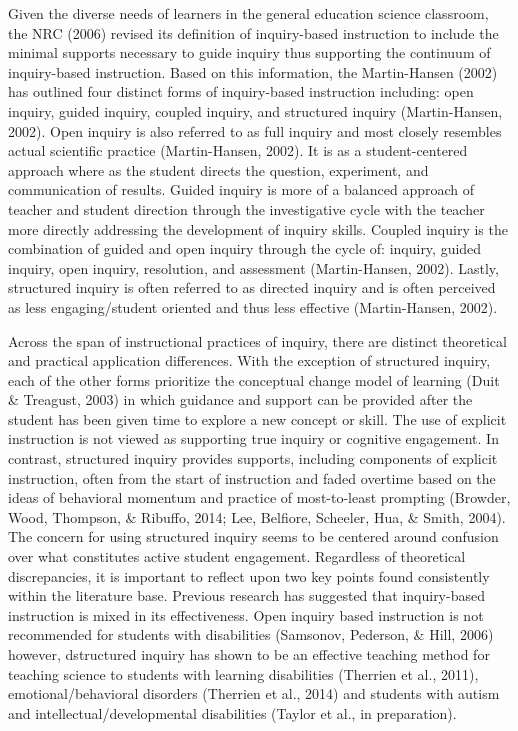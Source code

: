 \documentclass[11.5pt]{sig-alternate} %
\begin{document}
\begin{large}
Given the diverse needs of learners in the general education science classroom, the NRC (2006) revised its definition of inquiry-based instruction to include the minimal supports necessary to guide inquiry thus supporting the continuum of inquiry-based instruction.  Based on this information, the Martin-Hansen (2002) has outlined four distinct forms of inquiry-based instruction including: open inquiry, guided inquiry, coupled inquiry, and structured inquiry (Martin-Hansen, 2002).  Open inquiry is also referred to as full inquiry and most closely resembles actual scientific practice (Martin-Hansen, 2002).  It is as a student-centered approach where as the student directs the question, experiment, and communication of results.  Guided inquiry is more of a balanced approach of teacher and student direction through the investigative cycle with the teacher more directly addressing the development of inquiry skills.  Coupled inquiry is the combination of guided and open inquiry through the cycle of: inquiry, guided inquiry, open inquiry, resolution, and assessment (Martin-Hansen, 2002).  Lastly, structured inquiry is often referred to as directed inquiry and is often perceived as less engaging/student oriented and thus less effective (Martin-Hansen, 2002).  

Across the span of instructional practices of inquiry, there are distinct theoretical and practical application differences.  With the exception of structured inquiry, each of the other forms prioritize the conceptual change model of learning (Duit \& Treagust, 2003) in which guidance and support can be provided after the student has been given time to explore a new concept or skill.  The use of explicit instruction is not viewed as supporting true inquiry or cognitive engagement.  In contrast, structured inquiry provides supports, including components of explicit instruction, often from the start of instruction and faded overtime based on the ideas of behavioral momentum and practice of most-to-least prompting (Browder, Wood, Thompson, \& Ribuffo, 2014; Lee, Belfiore, Scheeler, Hua, \& Smith, 2004).  The concern for using structured inquiry seems to be centered around confusion over what constitutes active student engagement.  Regardless of theoretical discrepancies, it is important to reflect upon two key points found consistently within the literature base.  Previous research has suggested that inquiry-based instruction is mixed in its effectiveness.  Open inquiry based instruction is not recommended for students with disabilities (Samsonov, Pederson, \& Hill, 2006) however, dstructured inquiry has shown to be an effective teaching method for teaching science to students with learning disabilities (Therrien et al., 2011), emotional/behavioral disorders (Therrien et al., 2014) and students with autism and intellectual/developmental disabilities (Taylor et al., in preparation). 


\end{large}
\end{document}
